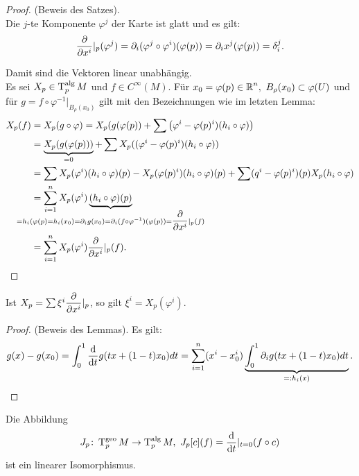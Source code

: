 \begin{proof}
  (Beweis des Satzes).\\

  Die $j$-te Komponente $\varphi^j$ der Karte ist glatt und es gilt:
  \begin{align*}
    \dfrac{\partial }{\partial x^i}|_p(\varphi^j) = \partial_i(\varphi^j \circ \varphi^i)(\varphi(p)) = \partial_ix^j(\varphi(p)) = \delta_i^j.
  \end{align*}

  Damit sind die Vektoren linear unabhängig.\\

  Es sei $X_p\in \operatorname{T}_p^{\text{alg}}M$ und $f \in C^{\infty}(M)$.
  Für $x_0=\varphi(p) \in \operatorname{\mathbb{R}}^n, \ B_{\rho}(x_0) \subset \varphi(U)$ und für $g = f \circ \varphi^{-1}|_{B_{\rho}(x_0)}$ gilt mit den Bezeichnungen wie im letzten Lemma:
  \begin{align*}
    X_p(f) & = X_p(g \circ \varphi) = X_p(g(\varphi(p)) + \sum \left(\varphi^i - \varphi(p)^i)(h_i \circ \varphi) \right)\\
    & = \underbrace{X_p(g(\varphi(p)))}_{\mathclap{=0}} + \sum X_p((\varphi^i-\varphi(p)^i)(h_i \circ \varphi))\\
    & = \sum X_p(\varphi^i)(h_i\circ\varphi)(p) - X_p(\varphi(p)^i)(h_i\circ \varphi)(p) + \sum (q^i-\varphi(p)^i)(p) X_p(h_i \circ \varphi)\\
    & = \sum_{i=1}^n X_p(\varphi^i)\underbrace{(h_i \circ \varphi)(p)}_{\mathclap{=h_i(\varphi(p) = h_i(x_0) = \partial_ig(x_0) = \partial_i(f\circ \varphi^{-1})(\varphi(p)) = \pdifffrac{x^i}|_p(f)}}\\
    & = \sum_{i=1}^nX_p(\varphi^i)\pdifffrac{x^i}|_p(f).
  \end{align*}
\end{proof}

\begin{bem}
  Ist $X_p=\sum \xi^i\dfrac{\partial }{\partial x^i}|_p$, so gilt $\xi^i = X_p(\varphi^i)$.
\end{bem}

\begin{proof}
  (Beweis des Lemmas). Es gilt:
  \begin{align*}
    g(x) - g(x_0) = \int_0^1\dfrac{\mathrm{d} }{\mathrm{d} t}g(tx + (1-t)x_0)dt = \sum_{i=1}^n(x^i-x_0^i)\underbrace{\int_0^1\partial_ig(tx + (1-t)x_0) dt}_{=: h_i(x)}.
  \end{align*}
\end{proof}

\begin{satz}
  Die Abbildung
  \begin{align*}
    J_p \colon \operatorname{T}_p^{\text{geo}}M \to \operatorname{T}_p^{\text{alg}}M, \ J_{p}[c](f) = \dfrac{\mathrm{d} }{\mathrm{d} t}|_{t=0}(f\circ c)
  \end{align*}
  ist ein linearer Isomorphismus.
\end{satz}

